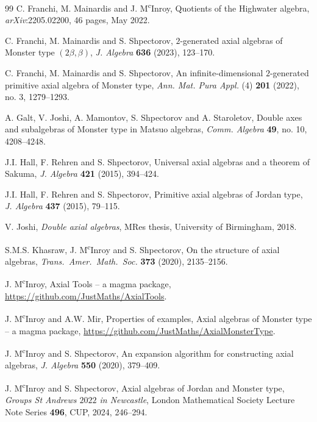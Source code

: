 \documentclass[11pt, a4paper]{article}
\theoremstyle{plain}
\theoremstyle{definition}
\newcommand\bt{\beta}
\newcommand{\0}{\overline{0}}
\newcommand{\2}{\overline{2}}
\newcommand{\1}{\mathbbm{1}}
\begin{document}
\begin{thebibliography}{99}
 C. Franchi, M. Mainardis and J. M\textsuperscript{c}Inroy, Quotients of the Highwater algebra, \textit{arXiv}:2205.02200, 46 pages, May 2022.

 C. Franchi, M. Mainardis and S. Shpectorov, $2$-generated axial algebras of Monster type $(2\bt,\bt)$, \textit{J. Algebra} {\bf 636} (2023), 123--170.

 C. Franchi, M. Mainardis and S. Shpectorov, An infinite-dimensional $2$-generated primitive axial algebra of Monster type, \textit{Ann. Mat. Pura Appl.} (4) {\bf 201} (2022), no. 3, 1279–1293.

 A. Galt, V. Joshi, A. Mamontov, S. Shpectorov and A. Staroletov, Double axes and subalgebras of Monster type in Matsuo algebras, \textit{Comm. Algebra} {\bf 49}, no. 10, 4208--4248.

 J.I. Hall, F. Rehren and S. Shpectorov, Universal axial algebras and a theorem of Sakuma, \textit{J. Algebra} {\bf 421} (2015), 394--424.

 J.I. Hall, F. Rehren and S. Shpectorov, Primitive axial algebras of Jordan type, \textit{J. Algebra} {\bf 437} (2015), 79--115.

 V. Joshi, \textit{Double axial algebras}, MRes thesis, University of Birmingham, 2018.

 S.M.S. Khasraw, J. M\textsuperscript{c}Inroy and S. Shpectorov, On the structure of axial algebras, \textit{Trans.\ Amer.\ Math.\ Soc.} {\bf 373} (2020), 2135--2156.

 J. M\textsuperscript{c}Inroy, Axial Tools -- a {\sc magma} package, \href{https://github.com/JustMaths/AxialTools}{\url{https://github.com/JustMaths/AxialTools}}.

 J. M\textsuperscript{c}Inroy and A.W. Mir, Properties of examples,  Axial algebras of Monster type -- a {\sc magma} package, \href{https://github.com/JustMaths/AxialMonsterType}{\url{https://github.com/JustMaths/AxialMonsterType}}.

 J. M\textsuperscript{c}Inroy and S. Shpectorov, An expansion algorithm for constructing axial algebras, \textit{J. Algebra} {\bf 550} (2020), 379--409.

 J. M\textsuperscript{c}Inroy and S. Shpectorov, Axial algebras of Jordan and Monster type, \textit{Groups St Andrews $2022$ in Newcastle}, London Mathematical Society Lecture Note Series {\bf 496}, CUP, 2024, 246--294.


\end{thebibliography}
\end{document}

